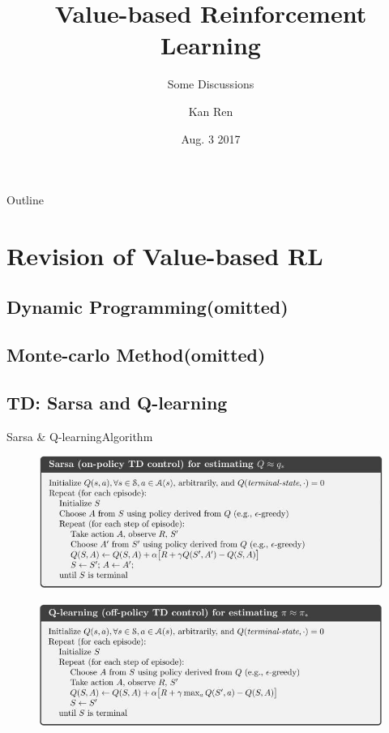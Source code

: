 \documentclass{beamer}
\title{Value-based Reinforcement Learning}
\subtitle{Some Discussions}
\author{Kan Ren}
\institute[SJTU] %
{
  Apex Data and Knowledge Management Lab\\
  Shanghai Jiao Tong University
}
\date{Aug. 3 2017}
\begin{document}
\begin{frame}
  \titlepage
\end{frame}

\begin{frame}{Outline}
  \tableofcontents
\end{frame}

\section{Revision of Value-based RL}

\subsection{Dynamic Programming(omitted)}
\subsection{Monte-carlo Method(omitted)}
\subsection{TD: Sarsa and Q-learning}

\begin{frame}{Sarsa \& Q-learning}{Algorithm}
  \begin{figure}[t]
  	\includegraphics[width=0.7\columnwidth]{figures/sarsa-alg.jpg}
  \end{figure}

  \begin{figure}[t]
  	\includegraphics[width=0.7\columnwidth]{figures/q-learning-alg.jpg}
  \end{figure}
\end{frame}
\end{document}
